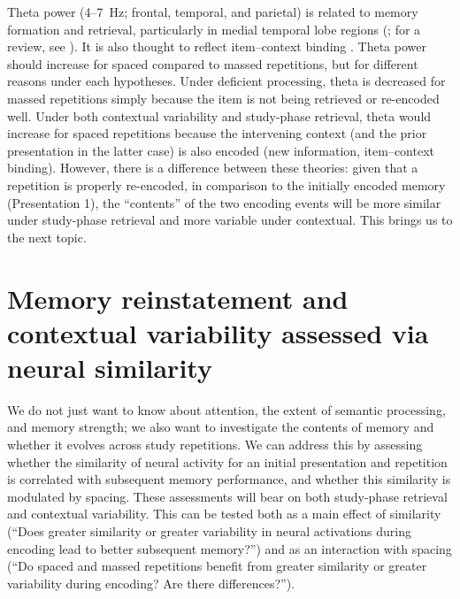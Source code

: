 Theta power (4--7~Hz; frontal, temporal, and parietal) is related to memory formation and retrieval, particularly in medial temporal lobe regions (; for a review, see ).  It is also thought to reflect item--context binding \cite{HansEtal2009a,HansEtal2011a,StauHans2013,SummMang2005}.  Theta power should increase for spaced compared to massed repetitions, but for different reasons under each hypotheses.  Under deficient processing, theta is decreased for massed repetitions simply because the item is not being retrieved or re-encoded well.
Under both contextual variability and study-phase retrieval, theta would increase for spaced repetitions because the intervening context (and the prior presentation in the latter case) is also encoded (new information, item--context binding).
However, there is a difference between these theories: given that a repetition is properly re-encoded, in comparison to the initially encoded memory (Presentation 1), the ``contents'' of the two encoding events will be more similar under study-phase retrieval and more variable under contextual.  This brings us to the next topic.




\section{Memory reinstatement and contextual variability assessed via neural similarity}

We do not just want to know about attention, the extent of semantic processing, and memory strength; we also want to investigate the contents of memory and whether it evolves across study repetitions.
We can address this by assessing whether the similarity of neural activity for an initial presentation and repetition is correlated with subsequent memory performance, and whether this similarity is modulated by spacing.  These assessments will bear on both study-phase retrieval and contextual variability.  This can be tested both as a main effect of similarity (``Does greater similarity or greater variability in neural activations during encoding lead to better subsequent memory?'') and as an interaction with spacing (``Do spaced and massed repetitions benefit from greater similarity or greater variability during encoding?  Are there differences?'').

